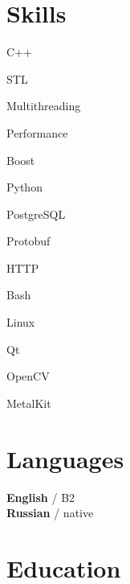 \documentclass[]{deedy-resume}
\begin{document}
\begin{minipage}[t]{0.25\textwidth}


\section{Skills}

\begin{tightitemize}
    \item C++ 
    \item STL
    \item Multithreading
    \item Performance
\end{tightitemize}

\begin{tightitemize}
    \item Boost
    \item Python
    \item PostgreSQL
    \item Protobuf
    \item HTTP
    \item Bash
    \item Linux
\end{tightitemize}

\begin{tightitemize}
    \item Qt
    \item OpenCV
    \item MetalKit
\end{tightitemize}

\sectionspace 


\section{Languages}
\textbf{English} / B2 \\
\textbf{Russian} / native

\sectionspace


\section{Education} 


\end{minipage}
\end{document}

